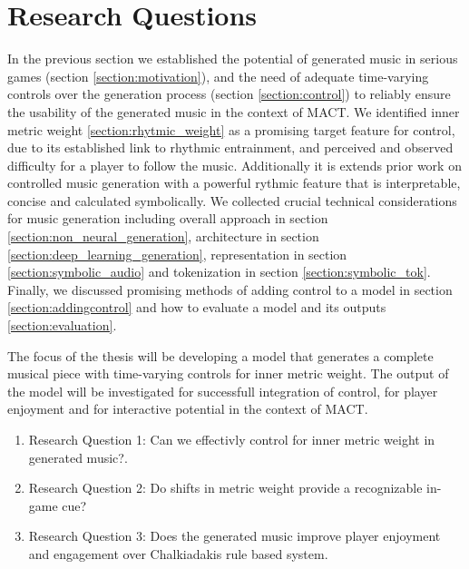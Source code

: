 

\chapter{Research Questions}
\label{chap:researchquestions}
\pagestyle{fancy}

In the previous section we established the potential of generated music in serious games (section \ref{section:motivation}), and the need of adequate time-varying controls over the generation process (section \ref{section:control}) to reliably ensure the usability of the generated music in the context of MACT. We identified inner metric weight \ref{section:rhytmic_weight} as a promising target feature for control, due to its established link to rhythmic entrainment, and perceived and observed difficulty for a player to follow the music. Additionally it is extends prior work on controlled music generation with a powerful rythmic feature that is interpretable, concise and calculated symbolically. 
We collected crucial technical considerations for music generation including overall approach in section \ref{section:non_neural_generation}, architecture in section \ref{section:deep_learning_generation}, representation in section \ref{section:symbolic_audio} and tokenization in section \ref{section:symbolic_tok}. Finally, we discussed promising methods of adding control to a model in section \ref{section:addingcontrol} and how to evaluate a model and its outputs \ref{section:evaluation}. 

The focus of the thesis will be developing a model that generates a complete musical piece with time-varying controls for inner metric weight. The output of the model will be investigated for successfull integration of control, for player enjoyment and for interactive potential in the context of MACT. 
  
\begin{enumerate}
\item{Research Question 1}: Can we effectivly control for inner metric weight in generated music?.

\item{Research Question 2}: Do shifts in metric weight provide a recognizable in-game cue?

\item {Research Question 3}: Does the generated music improve player enjoyment and engagement over Chalkiadakis\cite{Chalkiadakis_2022} rule based system. 
\end{enumerate}

